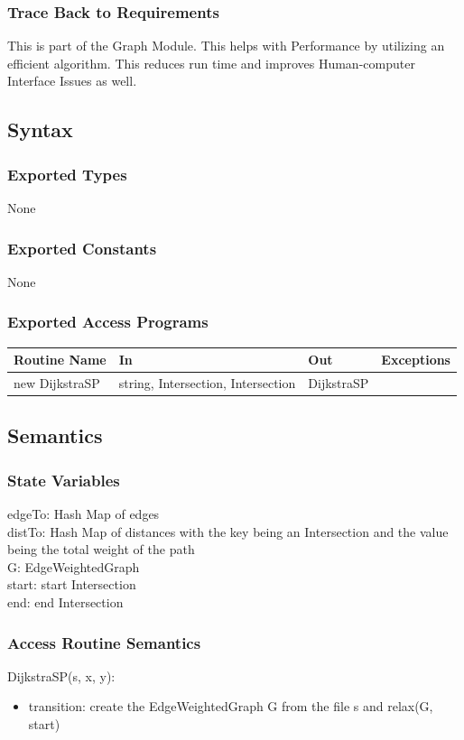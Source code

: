 \documentclass[12pt]{article}
\begin{document}
\subsubsection*{Trace Back to Requirements}
This is part of the Graph Module. This helps with Performance by utilizing an efficient algorithm. This reduces run time and improves Human-computer Interface Issues as well.

\subsection*{Syntax}
\subsubsection*{Exported Types}
None

\subsubsection*{Exported Constants}
None

\subsubsection*{Exported Access Programs}
    \begin{tabular}{|l|l|l|l|}
    \hline
    \textbf{Routine Name} & \textbf{In} & \textbf{Out} & \textbf{Exceptions}\\
    \hline
    new DijkstraSP & string, Intersection, Intersection & DijkstraSP & ~\\
    \hline
    \end{tabular}
    
\subsection*{Semantics}
\subsubsection*{State Variables}
edgeTo: Hash Map of edges\\
distTo: Hash Map of distances with the key being an Intersection and the value being the total weight of the path\\
G: EdgeWeightedGraph\\
start: start Intersection\\
end: end Intersection

\subsubsection*{Access Routine Semantics}
\noindent DijkstraSP(s, x, y):
\begin{itemize}
    \item transition: create the EdgeWeightedGraph G from the file s and relax(G, start)
\end{itemize}
\end{document}
